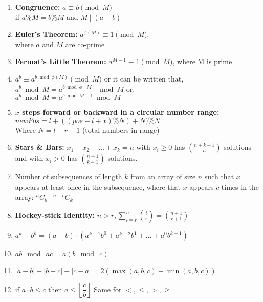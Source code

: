 \documentclass[10pt,a4paper,landscape]{article}
\begin{document}
\begin{multicols*}{3}
\begin{enumerate}
			\item \textbf{Congruence:} $a \equiv b \pmod{M}$\\ if $a\%M = b\%M$ and $M\mid(a-b)$
			
			\item \textbf{Euler's Theorem:} $a^{\phi{(M)}} \equiv 1 \pmod{M}$, \\where $a$ and $M$ are co-prime
			
			\item \textbf{Fermat's Little Theorem:} $a^{M-1} \equiv 1 \pmod{M}$, where M is prime
			
			\item $a^{b} \equiv a^{b\bmod{\phi(M)}} \pmod{M}$ or it can be written that, $a^{b}\bmod{M} = a^{b\bmod{\phi(M)}}\bmod{M}$ or,\\ $a^{b}\bmod{M} = a^{b\bmod{M-1}}\bmod{M}$
			
			\item \textbf{$x$ steps forward or backward in a circular number range:} \\ $newPos = l + ((pos-l+x)\%N)+N)\%N$\\ Where $N = l-r+1$ (total numbers in range)
			
			\item \textbf{Stars \& Bars:} $x_1 + x_2 + \dots + x_k = n$ with $x_i \ge 0$ has $\binom{n + k - 1}{n}$ solutions and with $x_i > 0$ has $\binom{n - 1}{k - 1}$ solutions.
			
			\item Number of subsequences of length $k$ from an array of size $n$ such that $x$ appears at least once in the subsequence, where that $x$ appears $c$ times in the array: $^nC_k - ^{n-c}C_k$ 
			
			\item \textbf{Hockey-stick Identity: } $n > r, \sum \limits_{i=r}^n{i \choose r}={n+1 \choose r+1}$
			
			\item $a^k - b^k = (a - b) \cdot (a^{k - 1}b^0 + a^{k - 2}b^1 + … + a^0b^{k - 1})$
			
			\item $ab \mod\ ac=a(b \mod\ c)$
			
			\item $|a - b| + |b - c| + |c - a| = 2 (\max (a, b, c) - \min (a, b, c))$
			
			\item if $a \cdot b \leq c$ then $a \leq \left \lfloor \dfrac{c}{b} \right \rfloor$ Same for $<, \leq, >, \geq$
			

\end{enumerate}
\end{multicols*}
\end{document}
